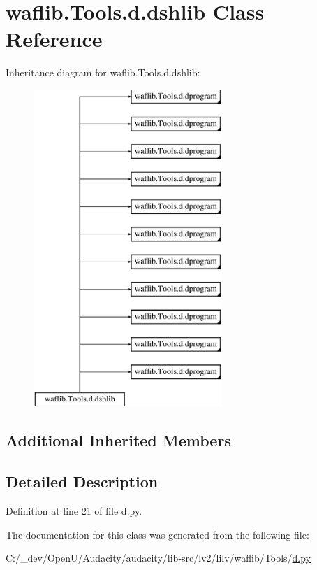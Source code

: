 \hypertarget{classwaflib_1_1_tools_1_1d_1_1dshlib}{}\section{waflib.\+Tools.\+d.\+dshlib Class Reference}
\label{classwaflib_1_1_tools_1_1d_1_1dshlib}
Inheritance diagram for waflib.\+Tools.\+d.\+dshlib\+:\begin{figure}[H]
\begin{center}
\leavevmode
\includegraphics[height=12.000000cm]{classwaflib_1_1_tools_1_1d_1_1dshlib}
\end{center}
\end{figure}
\subsection*{Additional Inherited Members}


\subsection{Detailed Description}


Definition at line 21 of file d.\+py.



The documentation for this class was generated from the following file\+:\begin{DoxyCompactItemize}
\item 
C\+:/\+\_\+dev/\+Open\+U/\+Audacity/audacity/lib-\/src/lv2/lilv/waflib/\+Tools/\hyperlink{lilv_2waflib_2_tools_2d_8py}{d.\+py}\end{DoxyCompactItemize}
